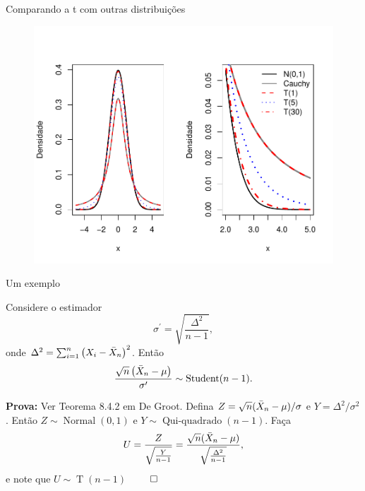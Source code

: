 \begin{frame}{Comparando a t com outras distribuições}
\begin{figure}[!ht]
 \begin{center}
  \includegraphics[scale=.6]{figures/comparacao_t_Student.pdf}
 \end{center}
\end{figure} 
\end{frame}

\begin{frame}{Um exemplo}
\begin{theo}
 Considere o estimador 
 \begin{equation*}
  \sigma^\prime = \sqrt{\frac{\Delta^2}{n-1}},
 \end{equation*}
onde $\Delta^2 = \sum_{i=1}^n \left(X_i - \bar{X}_n\right)^2$.
Então 
\begin{equation*}
 \frac{\sqrt{n}\left(\bar{X}_n - \mu\right)}{\sigma^\prime} \sim \operatorname{Student}(n-1).
\end{equation*}
\end{theo}
\textbf{Prova:}
Ver Teorema 8.4.2 em De Groot.
Defina $Z = \sqrt{n}(\bar{X}_n - \mu)/\sigma$ e $Y = \Delta^2/\sigma^2$.
Então $Z \sim\operatorname{Normal}(0,1)$ e $Y\sim\operatorname{Qui-quadrado}(n-1)$.
Faça
\begin{equation}
 U = \frac{Z}{\sqrt{\frac{Y}{n-1}}} = \frac{\sqrt{n}(\bar{X}_n-\mu)}{\sqrt{\frac{\Delta^2}{n-1}}},
\end{equation}
e note que $U \sim \operatorname{T}(n-1)$  $\qed$
\end{frame}

